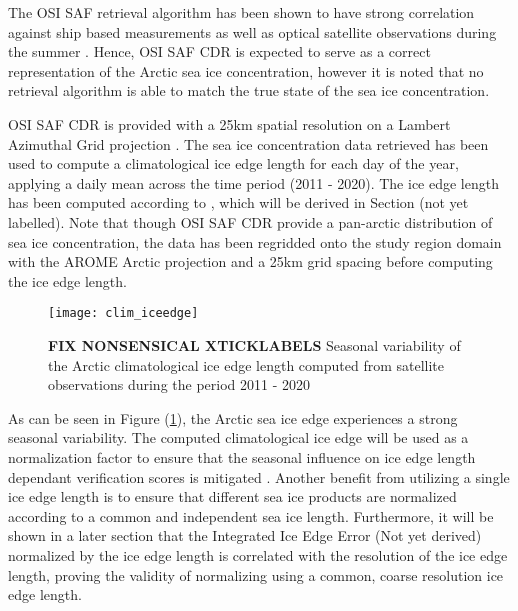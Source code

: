\documentclass[../main/thesis.tex]{subfiles}
\begin{document}
The OSI SAF retrieval algorithm has been shown to have strong correlation against ship based measurements \citep{Kern2019} as well as optical satellite observations during the summer \citep{Kern2020}. Hence, OSI SAF CDR is expected to serve as a correct representation of the Arctic sea ice concentration, however it is noted that no retrieval algorithm is able to match the true state of the sea ice concentration.

OSI SAF CDR is provided with a 25km spatial resolution on a Lambert Azimuthal Grid projection \citep{Soerensen2021}. The sea ice concentration data retrieved has been used to compute a climatological ice edge length for each day of the year, applying a daily mean across the time period (2011 - 2020). The ice edge length has been computed according to \citep{Melsom2019}, which will be derived in Section (not yet labelled). Note that though OSI SAF CDR provide a pan-arctic distribution of sea ice concentration, the data has been regridded onto the study region domain with the  AROME Arctic projection and a 25km grid spacing before computing the ice edge length.

\begin{figure}
    \centering
    \texttt{[image: clim\_iceedge]}
    \caption{\label{fig:clim_iceedge} \textbf{FIX NONSENSICAL XTICKLABELS} Seasonal variability of the Arctic climatological ice edge length computed from satellite observations during the period 2011 - 2020}
\end{figure}

As can be seen in Figure (\ref{fig:clim_iceedge}), the Arctic sea ice edge experiences a strong seasonal variability. The computed climatological ice edge will be used as a normalization factor to ensure that the seasonal influence on ice edge length dependant verification scores is mitigated \citep{Goessling2016, Zampieri2019, Palerme2019}. Another benefit from utilizing a single ice edge length is to ensure that different sea ice products are normalized according to a common and independent sea ice length. Furthermore, it will be shown in a later section that the Integrated Ice Edge Error \citep{Goessling2016} (Not yet derived) normalized by the ice edge length is correlated with the resolution of the ice edge length, proving the validity of normalizing using a common, coarse resolution ice edge length.
\end{document}
